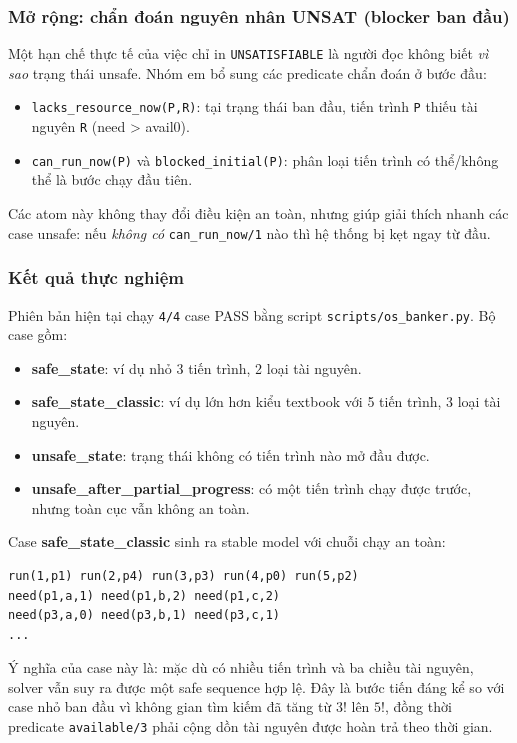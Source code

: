 ﻿\documentclass[11pt,a4paper]{article}
\begin{document}
\subsubsection*{Mở rộng: chẩn đoán nguyên nhân UNSAT (blocker ban đầu)}
Một hạn chế thực tế của việc chỉ in \texttt{UNSATISFIABLE} là người đọc không biết \textit{vì sao} trạng thái unsafe. Nhóm em bổ sung các predicate chẩn đoán ở bước đầu:
\begin{itemize}[leftmargin=1.5em]
  \item \texttt{lacks\_resource\_now(P,R)}: tại trạng thái ban đầu, tiến trình \texttt{P} thiếu tài nguyên \texttt{R} (need > avail0).
  \item \texttt{can\_run\_now(P)} và \texttt{blocked\_initial(P)}: phân loại tiến trình có thể/không thể là bước chạy đầu tiên.
\end{itemize}
Các atom này không thay đổi điều kiện an toàn, nhưng giúp giải thích nhanh các case unsafe: nếu \textit{không có} \texttt{can\_run\_now/1} nào thì hệ thống bị kẹt ngay từ đầu.

\subsubsection*{Kết quả thực nghiệm}
Phiên bản hiện tại chạy \texttt{4/4} case PASS bằng script \texttt{scripts/os\_banker.py}. Bộ case gồm:
\begin{itemize}[leftmargin=1.5em]
  \item \textbf{safe\_state}: ví dụ nhỏ 3 tiến trình, 2 loại tài nguyên.
  \item \textbf{safe\_state\_classic}: ví dụ lớn hơn kiểu textbook với 5 tiến trình, 3 loại tài nguyên.
  \item \textbf{unsafe\_state}: trạng thái không có tiến trình nào mở đầu được.
  \item \textbf{unsafe\_after\_partial\_progress}: có một tiến trình chạy được trước, nhưng toàn cục vẫn không an toàn.
\end{itemize}

Case \textbf{safe\_state\_classic} sinh ra stable model với chuỗi chạy an toàn:
\begin{lstlisting}[language={}]
run(1,p1) run(2,p4) run(3,p3) run(4,p0) run(5,p2)
need(p1,a,1) need(p1,b,2) need(p1,c,2)
need(p3,a,0) need(p3,b,1) need(p3,c,1)
...
\end{lstlisting}

Ý nghĩa của case này là: mặc dù có nhiều tiến trình và ba chiều tài nguyên, solver vẫn suy ra được một safe sequence hợp lệ. Đây là bước tiến đáng kể so với case nhỏ ban đầu vì không gian tìm kiếm đã tăng từ \(3!\) lên \(5!\), đồng thời predicate \texttt{available/3} phải cộng dồn tài nguyên được hoàn trả theo thời gian.
\end{document}
